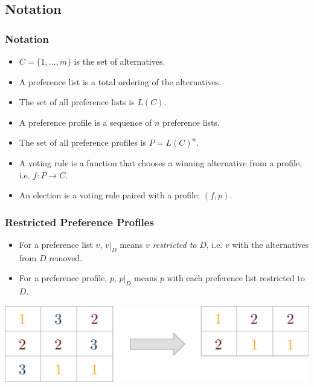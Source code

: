 \documentclass[aspectratio=169]{beamer}
\begin{document}
	\subsection{Notation}

		\begin{frame}
			\frametitle{Notation}
			\begin{itemize}
				\item $C = \{1, \ldots, m\}$ is the set of alternatives.
				\item A preference list is a total ordering of the alternatives.
				\item The set of all preference lists is $L(C)$.
				\item A preference profile is a sequence of $n$ preference lists.
				\item The set of all preference profiles is $P = L(C)^n$.
				\item A voting rule is a function that chooses a winning alternative from a profile, i.e. $f : P \to C$.
				\item An election is a voting rule paired with a profile: $(f, p)$.
			\end{itemize}

		\end{frame}

		\begin{frame}
			\frametitle{Restricted Preference Profiles}
			\begin{itemize}
				\item For a preference list $v$, $v|_D$ means $v$ \emph{restricted to} $D$, i.e. $v$ with the alternatives from $D$ removed.
				\item For a preference profile, $p$, $p|_D$ means $p$ with each preference list restricted to $D$.
			\end{itemize}

			\hspace*{3.5cm}{\Large $p$}\hspace{6.2cm}{\Large $p|_{\{1, 2\}}$}

			\vspace{.5em}
			\centerline{\includegraphics[height=0.3\paperheight, keepaspectratio]{../figures/restriction_example.pdf}}
		\end{frame}
\end{document}
